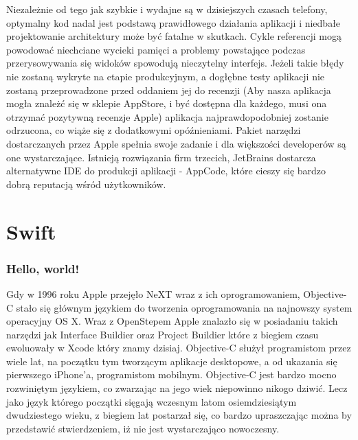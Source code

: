 Niezależnie od tego jak szybkie i wydajne są w dzisiejszych czasach telefony, optymalny kod nadal jest podstawą prawidłowego działania aplikacji i niedbałe projektowanie architektury może być fatalne w skutkach. Cykle referencji mogą powodować niechciane wycieki pamięci a problemy powstające podczas przerysowywania się widoków spowodują nieczytelny interfejs. Jeżeli takie błędy nie zostaną wykryte na etapie produkcyjnym, a dogłębne testy aplikacji nie zostaną przeprowadzone przed oddaniem jej do recenzji (Aby nasza aplikacja mogła znależć się w sklepie AppStore, i być dostępna dla każdego, musi ona otrzymać pozytywną recenzje Apple) aplikacja najprawdopodobniej zostanie odrzucona, co wiąże się z dodatkowymi opóźnieniami. Pakiet narzędzi dostarczanych przez Apple spełnia swoje zadanie i dla większości developerów są one wystarczające. Istnieją rozwiązania firm trzecich, JetBrains dostarcza alternatywne IDE do produkcji aplikacji - AppCode, które cieszy się bardzo dobrą reputacją wśród użytkowników.

\section{Swift}

\subsubsection*{Hello, world!}

Gdy w 1996 roku Apple przejęło NeXT wraz z ich oprogramowaniem, Objective-C stało się głównym językiem do tworzenia oprogramowania na najnowszy system operacyjny OS X. Wraz z OpenStepem Apple znalazło się w posiadaniu takich narzędzi jak Interface Buildier oraz Project Buildier które z biegiem czasu ewoluowały w Xcode który znamy dzisiaj. Objective-C służył programistom przez wiele lat, na początku tym tworzącym aplikacje desktopowe, a od ukazania się pierwszego iPhone'a, programistom mobilnym. Objective-C jest bardzo mocno rozwiniętym językiem, co zwarzając na jego wiek niepowinno nikogo dziwić. Lecz jako język którego początki sięgają wczesnym latom osiemdziesiątym dwudziestego wieku, z biegiem lat postarzał się, co bardzo upraszczając można by przedstawić stwierdzeniem, iż nie jest wystarczająco nowoczesny.

